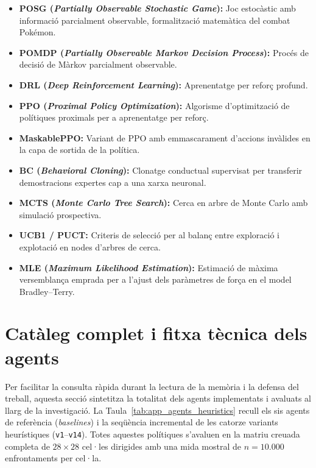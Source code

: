 \begin{itemize}
    \item \textbf{POSG (\emph{Partially Observable Stochastic Game}):} Joc estocàstic amb informació parcialment observable, formalització matemàtica del combat Pokémon.
    \item \textbf{POMDP (\emph{Partially Observable Markov Decision Process}):} Procés de decisió de Màrkov parcialment observable.
    \item \textbf{DRL (\emph{Deep Reinforcement Learning}):} Aprenentatge per reforç profund.
    \item \textbf{PPO (\emph{Proximal Policy Optimization}):} Algorisme d'optimització de polítiques proximals per a aprenentatge per reforç.
    \item \textbf{MaskablePPO:} Variant de PPO amb emmascarament d'accions invàlides en la capa de sortida de la política.
    \item \textbf{BC (\emph{Behavioral Cloning}):} Clonatge conductual supervisat per transferir demostracions expertes cap a una xarxa neuronal.
    \item \textbf{MCTS (\emph{Monte Carlo Tree Search}):} Cerca en arbre de Monte Carlo amb simulació prospectiva.
    \item \textbf{UCB1 / PUCT:} Criteris de selecció per al balanç entre exploració i explotació en nodes d'arbres de cerca.
    \item \textbf{MLE (\emph{Maximum Likelihood Estimation}):} Estimació de màxima versemblança emprada per a l'ajust dels paràmetres de força en el model Bradley--Terry.
\end{itemize}

\section{Catàleg complet i fitxa tècnica dels agents}
\label{sec:app_agents_catalog}

Per facilitar la consulta ràpida durant la lectura de la memòria i la defensa del treball, aquesta secció sintetitza la totalitat dels agents implementats i avaluats al llarg de la investigació. La Taula~\ref{tab:app_agents_heuristics} recull els sis agents de referència (\emph{baselines}) i la seqüència incremental de les catorze variants heurístiques (\texttt{v1}--\texttt{v14}). Totes aquestes polítiques s'avaluen en la matriu creuada completa de $28 \times 28$ cel·les dirigides amb una mida mostral de $n=10.000$ enfrontaments per cel·la.


